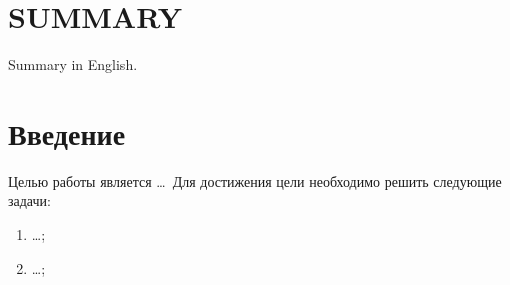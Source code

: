 \section*{SUMMARY}
\begin{minipage}[t][0.4\textheight][t]{0.9\linewidth}
	\setlength{\parindent}{1.25cm}
	\indent
	Summary in English.
\end{minipage}

\newpage

\let \savenumberline \numberline
\def \numberline#1{\savenumberline{#1.}}

\tableofcontents

\newpage

\section*{Введение}

Целью работы является \ldots\ Для достижения цели необходимо решить следующие задачи:

\begin{enumerate}
	\item \ldots;
	\item \ldots;
\end{enumerate}

\newpage
